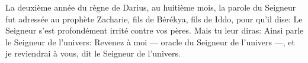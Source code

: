 La deuxième année du règne de Darius, au huitième mois,
	la parole du Seigneur fut adressée au prophète Zacharie,
		fils de Bérékya, fils de Iddo, pour qu’il dise:
	Le Seigneur s’est profondément irrité contre vos pères.
Mais tu leur diras: Ainsi parle le Seigneur de l’univers:
	Revenez à moi --- oracle du Seigneur de l’univers ---,
	et je reviendrai à vous, dit le Seigneur de l’univers.
